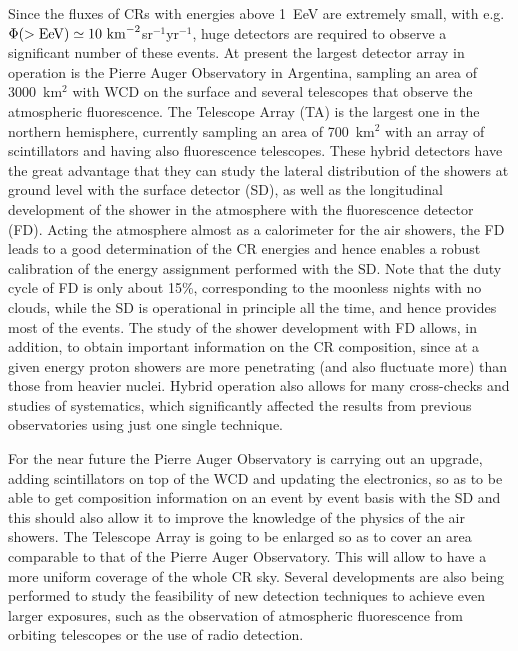 \documentclass[twoside,12pt]{article}
\begin{document}
Since the fluxes of CRs with energies above 1~EeV are extremely small, with e.g.  $\Phi(>{\rm EeV})\simeq 10~{\rm km}^{-2}$sr$^{-1}$yr$^{-1}$, huge detectors are required to observe a significant number of these events.  At present the largest detector array in operation is the Pierre Auger Observatory in Argentina, sampling an area of 3000~km$^2$ with WCD on the surface and several telescopes that observe the atmospheric fluorescence. The Telescope Array (TA) is the largest one in the northern hemisphere, currently sampling an area of 700~km$^2$ with an array of scintillators  and having also fluorescence telescopes. These hybrid detectors have the great advantage that they can study the lateral distribution of the showers at ground level with the surface detector (SD), as well as the longitudinal development of the shower  in the atmosphere with the fluorescence detector (FD). Acting the atmosphere almost as a calorimeter for the air showers, the FD leads to a good determination of the CR energies and hence enables a robust calibration of the energy assignment performed with the SD. Note that  the duty cycle of FD is only about 15\%, corresponding to the moonless nights with no clouds, while the SD is operational in principle all the time, and hence provides most of the events. The study of the shower development with FD allows,  in addition, to obtain important information on the CR composition, since at a given energy proton showers are  more penetrating (and also fluctuate more) than those from heavier nuclei. Hybrid operation also allows for many cross-checks and studies of systematics, which significantly affected the results from previous observatories using just one single technique.

For the near future the Pierre Auger Observatory is  carrying out an upgrade, adding scintillators on top of the WCD and updating the electronics, so as to be able to get composition information on an event by event basis with the SD and this should also allow it to improve the knowledge of the physics of the air showers. The Telescope Array is going to be enlarged so as to cover an area comparable to that of the Pierre Auger Observatory. This will allow to have a more uniform coverage of the whole CR sky. Several developments are also being performed to study the feasibility of new detection techniques to achieve  even larger exposures, such as the observation of atmospheric fluorescence from orbiting telescopes or the use of radio detection.
\end{document}
